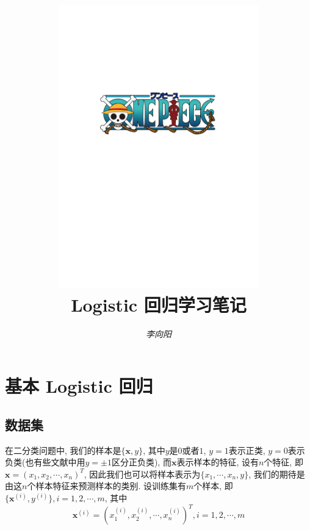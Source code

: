 \documentclass[a4paper,UTF8]{ctexart}
\theoremstyle{plain} \newtheorem{theorem}{定理}[section]
\theoremstyle{plain} \newtheorem{definition}{定义}[section]
\theoremstyle{plain} \newtheorem{lemma}{引理}[section]
\theoremstyle{plain} \newtheorem{proposition}{命题}[section]
\theoremstyle{plain} \newtheorem{example}{例}[section]
\theoremstyle{plain} \newtheorem{remark}{注}[section]
\theoremstyle{plain} \newtheorem{corollary}{推论}[section]
\begin{document}
\title{
\includegraphics[width=0.65\textwidth]{onepiece.pdf}\\
\vspace{2em}
\textbf{Logistic 回归学习笔记}}
\author{\emph{李向阳} 
}
\date{}


\maketitle
\thispagestyle{empty}

\newpage


\tableofcontents

\newpage

\section{基本 Logistic 回归}

\subsection{数据集}
在二分类问题中, 我们的样本是$\{\bm{x},y\}$, 其中$y$是$0$或者$1$, $y = 1$表示正类, $y = 0$表示负类(也有些文献中用$y = \pm 1$区分正负类), 而$\bm{x}$表示样本的特征, 设有$n$个特征, 即$\bm{x} = (x_{1}, x_{2}, \cdots, x_{n})^{T}$, 因此我们也可以将样本表示为$\{ x_{1}, \cdots, x_{n}, y \}$, 我们的期待是由这$n$个样本特征来预测样本的类别. 设训练集有$m$个样本, 即$\{\bm{x}^{(i)}, y^{(i)}\}, i = 1,2,\cdots,m$, 其中
\begin{equation*}
\bm{x}^{(i)} = (x_{1}^{(i)}, x_{2}^{(i)}, \cdots, x_{n}^{(i)})^{T},i = 1,2,\cdots,m
\end{equation*}
\end{document}
